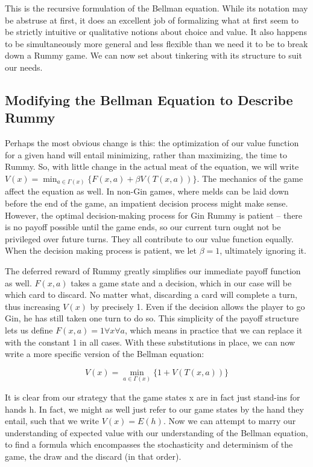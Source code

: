 \documentclass[letter,12pt]{article}
\begin{document}
This is the recursive formulation of the Bellman equation. While its notation may be abstruse at first, it does an excellent job of formalizing what at first seem to be strictly intuitive or qualitative notions about choice and value. It also happens to be simultaneously more general and less flexible than we need it to be to break down a Rummy game. We can now set about tinkering with its structure to suit our needs. 

\subsection{Modifying the Bellman Equation to Describe Rummy}

Perhaps the most obvious change is this: the optimization of our value function for a given hand will entail minimizing, rather than maximizing, the time to Rummy. So, with little change in the actual meat of the equation, we will write $V(x) = \min_{a \in \Gamma(x)}\{F(x,a)+\beta V(T(x,a))\}$. The mechanics of the game affect the equation as well. In non-Gin games, where melds can be laid down before the end of the game, an impatient decision process might make sense. However, the optimal decision-making process for Gin Rummy is patient – there is no payoff possible until the game ends, so our current turn ought not be privileged over future turns. They all contribute to our value function equally. When the decision making process is patient, we let $\beta= 1$, ultimately ignoring it. 
 
The deferred reward of Rummy greatly simplifies our immediate payoff function as well. $F(x,a)$ takes a game state and a decision, which in our case will be which card to discard. No matter what, discarding a card will complete a turn, thus increasing $V(x)$ by precisely 1. Even if the decision allows the player to go Gin, he has still taken one turn to do so. This simplicity of the payoff structure lets us define $F(x,a) = 1 \forall x \forall a$, which means in practice that we can replace it with the constant 1 in all cases. With these substitutions in place, we can now write a more specific version of the Bellman equation:

$$V(x) = \min_{a \in \Gamma (x)} \{1+V(T(x,a))\}$$

It is clear from our strategy that the game states x are in fact just stand-ins for hands h. In fact, we might as well just refer to our game states by the hand they entail, such that we write $V(x) = E(h)$. Now we can attempt to marry our understanding of expected value with our understanding of the Bellman equation, to find a formula which encompasses the stochasticity and determinism of the game, the draw and the discard (in that order). 
\end{document}

